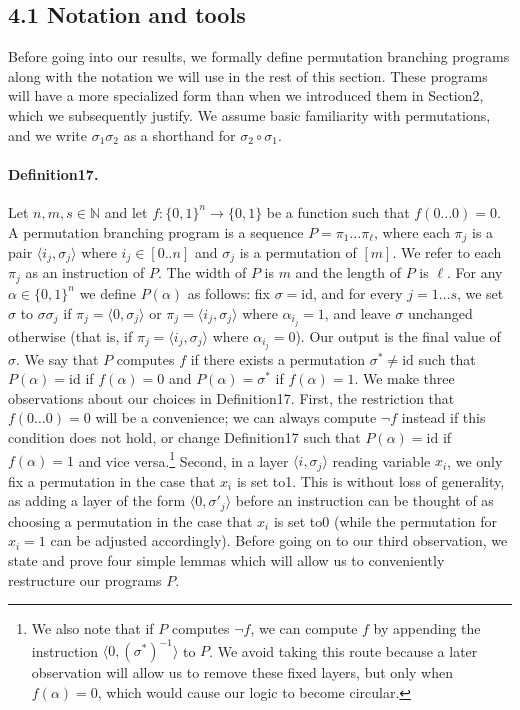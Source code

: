 \subsection*{4.1 Notation and tools}
Before going into our results, we formally define permutation branching programs along with the notation we will use in the rest of this section. These programs will have a more specialized form than when we introduced them in Section2, which we subsequently justify. We assume basic familiarity with permutations, and we write $\sigma_1\sigma_2$ as a shorthand for $\sigma_2\circ\sigma_1$.
\paragraph{Definition17.} Let $n,m,s\in\mathbb N$ and let $f:\{0,1\}^n\to\{0,1\}$ be a function such that $f(0\ldots0)=0$. A permutation branching program is a sequence $P=\pi_1\ldots\pi_{\ell}$, where each $\pi_j$ is a pair $\langle i_j,\sigma_j\rangle$ where $i_j\in[0..n]$ and $\sigma_j$ is a permutation of $[m]$. We refer to each $\pi_j$ as an instruction of $P$. The width of $P$ is $m$ and the length of $P$ is $\ell$.
For any $\alpha\in\{0,1\}^n$ we define $P(\alpha)$ as follows: fix $\sigma=\mathrm{id}$, and for every $j=1\ldots s$, we set $\sigma$ to $\sigma\sigma_j$ if $\pi_j=\langle0,\sigma_j\rangle$ or $\pi_j=\langle i_j,\sigma_j\rangle$ where $\alpha_{i_j}=1$, and leave $\sigma$ unchanged otherwise (that is, if $\pi_j=\langle i_j,\sigma_j\rangle$ where $\alpha_{i_j}=0$). Our output is the final value of $\sigma$. We say that $P$ computes $f$ if there exists a permutation $\sigma^*\neq\mathrm{id}$ such that $P(\alpha)=\mathrm{id}$ if $f(\alpha)=0$ and $P(\alpha)=\sigma^*$ if $f(\alpha)=1$.
We make three observations about our choices in Definition17. First, the restriction that $f(0\ldots0)=0$ will be a convenience; we can always compute $\neg f$ instead if this condition does not hold, or change Definition17 such that $P(\alpha)=\mathrm{id}$ if $f(\alpha)=1$ and vice versa.\footnote{We also note that if $P$ computes $\neg f$, we can compute $f$ by appending the instruction $\langle0,(\sigma^*)^{-1}\rangle$ to $P$. We avoid taking this route because a later observation will allow us to remove these fixed layers, but only when $f(\alpha)=0$, which would cause our logic to become circular.} Second, in a layer $\langle i,\sigma_j\rangle$ reading variable $x_i$, we only fix a permutation in the case that $x_i$ is set to1. This is without loss of generality, as adding a layer of the form $\langle0,\sigma'_j\rangle$ before an instruction can be thought of as choosing a permutation in the case that $x_i$ is set to0 (while the permutation for $x_i=1$ can be adjusted accordingly).
Before going on to our third observation, we state and prove four simple lemmas which will allow us to conveniently restructure our programs $P$.
